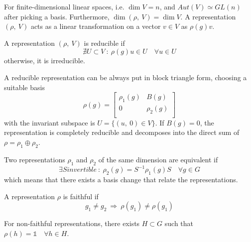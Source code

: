     For finite-dimensional linear spaces, i.e. $\dim V = n$, and $Aut(V) \simeq GL(n)$ after picking a basis. Furthermore, $\dim (\rho, ~V) = \dim V$. A representation $(\rho, ~V)$ acts as a linear transformation on a vector $v \in V$ as $\rho(g) v$.

    \begin{definition}
        A representation $(\rho, ~V)$ is reducible if 
        \begin{equation*}
            \nexists U \subset V ~\colon~ \rho(g) u \in U \quad \forall u \in U
        \end{equation*}
        otherwise, it is irreducible.
    \end{definition}

    A reducible representation can be always put in block triangle form, choosing a suitable basis 
    \begin{equation*}
        \rho(g) = 
        \begin{bmatrix}
            \rho_1(g) & B(g) \\
            0 & \rho_2(g) \\
        \end{bmatrix}
    \end{equation*}
    with the invariant subspace is $U = \{(u, ~0) \in V\}$. If $B(g)=0$, the representation is completely reducible and decomposes into the direct sum of $\rho = \rho_1 \oplus \rho_2$. 

    \begin{definition}
        Two representations $\rho_1$ and $\rho_2$ of the same dimension are equivalent if 
        \begin{equation*}
            \exists S invertible ~\colon~ \rho_2(g) = S^{-1} \rho_1(g) S \quad \forall g \in G
        \end{equation*}
        which means that there exists a basis change that relate the representations.
    \end{definition}

    \begin{definition}
        A representation $\rho$ is faithful if 
        \begin{equation*}
            g_1 \neq g_2 ~\Rightarrow~ \rho(g_1) \neq \rho(g_1)
        \end{equation*}
    \end{definition}

    For non-faithful representations, there exists $H \subset G$ such that $\rho(h) = \mathds 1 \quad \forall h \in H$.

